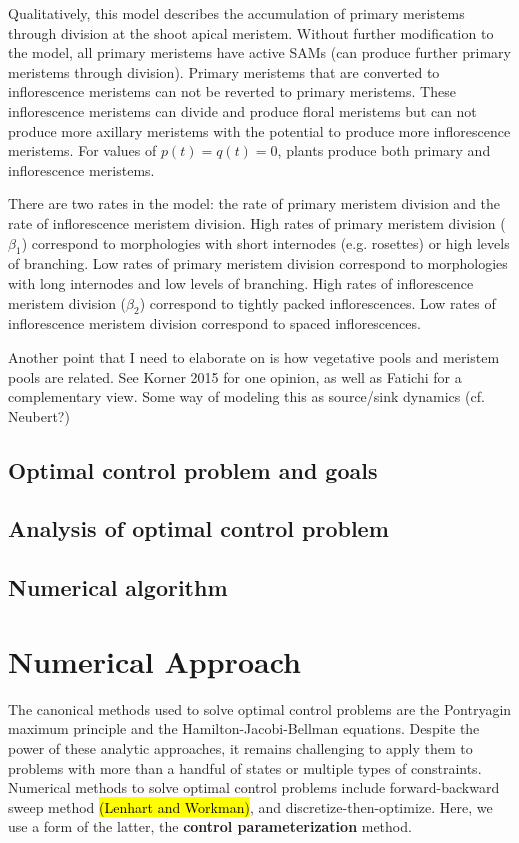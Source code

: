 \documentclass[12pt, oneside]{article}   	%
\begin{document}
Qualitatively, this model describes the accumulation of primary meristems through division at the shoot apical meristem. Without further modification to the model, all primary meristems have active SAMs (can produce further primary meristems through division). Primary meristems that are converted to inflorescence meristems can not be reverted to primary meristems. These inflorescence meristems can divide and produce floral meristems but can not produce more axillary meristems with the potential to produce more inflorescence meristems. For values of $p(t)=q(t)=0$, plants produce both primary and inflorescence meristems. 

There are two rates in the model: the rate of primary meristem division and the rate of inflorescence meristem division. High rates of primary meristem division ($\beta_1$) correspond to morphologies with short internodes (e.g. rosettes) or high levels of branching. Low rates of primary meristem division correspond to morphologies with long internodes and low levels of branching. High rates of inflorescence meristem division ($\beta_2$) correspond to tightly packed inflorescences. Low rates of inflorescence meristem division correspond to spaced inflorescences.

Another point that I need to elaborate on is how vegetative pools and meristem pools are related. See Korner 2015 for one opinion, as well as Fatichi for a complementary view. Some way of modeling this as source/sink dynamics (cf. Neubert?)

\subsection{Optimal control problem and goals}


\subsection{Analysis of optimal control problem}

\subsection{Numerical algorithm}


\section*{Numerical Approach}

The canonical methods used to solve optimal control problems are the Pontryagin maximum principle and the Hamilton-Jacobi-Bellman equations. Despite the power of these analytic approaches, it remains challenging to apply them to problems with more than a handful of states or multiple types of constraints. Numerical methods to solve optimal control problems include forward-backward sweep method \hl{(Lenhart and Workman)}, and discretize-then-optimize. Here, we use a form of the latter, the \textbf{control parameterization} method. 
\end{document}
